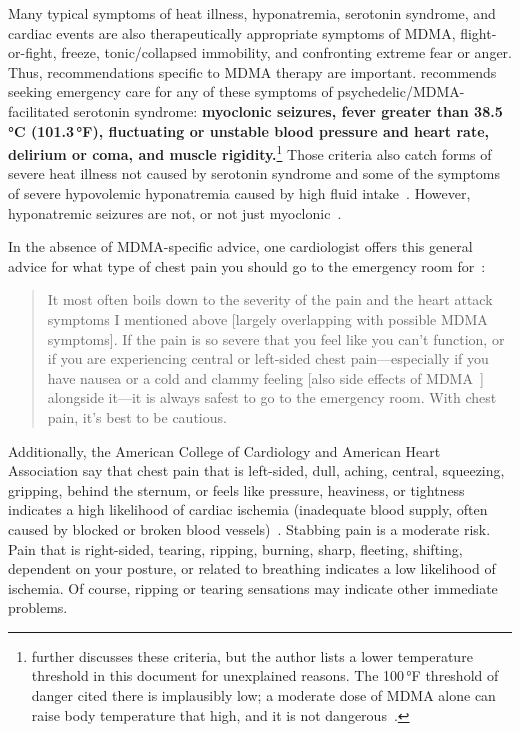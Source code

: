 \documentclass[11pt,oneside]{book}
\let\cite\parencite
\begin{document}
Many typical symptoms of heat illness, hyponatremia, serotonin syndrome, and cardiac events are also therapeutically appropriate symptoms of MDMA, flight-or-fight, freeze, tonic/collapsed immobility, and confronting extreme fear or anger. Thus, recommendations specific to MDMA therapy are important. \textcite{malcolmAyahuasca} recommends seeking emergency care for any of these symptoms of psychedelic/MDMA-facilitated serotonin syndrome: \textbf{myoclonic seizures, fever greater than 38.5\,°C (101.3\,°F), fluctuating or unstable blood pressure and heart rate, delirium or coma, and muscle rigidity.}\footnote{\textcite{malcolmER} further discusses these criteria, but the author lists a lower temperature threshold in this document for unexplained reasons. The 100\,°F threshold of danger cited there is implausibly low; a moderate dose of MDMA alone can raise body temperature that high, and it is not dangerous~\cite{liechtiTemperature}.} Those criteria also catch forms of severe heat illness not caused by serotonin syndrome and some of the symptoms of severe hypovolemic hyponatremia caused by high fluid intake~\cite{merckHyponatremia}. However, hyponatremic seizures are not, or not just myoclonic~\cite{nardoneAcuteSymptomaticSeizures2016}.

In the absence of MDMA-specific advice, one cardiologist offers this general advice for what type of chest pain you should go to the emergency room for~\cite{chestPain}:
\begin{quotation}
    It most often boils down to the severity of the pain and the heart attack symptoms I mentioned above [largely overlapping with possible MDMA symptoms]. If the pain is so severe that you feel like you can't function, or if you are experiencing central or left-sided chest pain---especially if you have nausea or a cold and clammy feeling [also side effects of MDMA~\cite{liechtiGender}] alongside it---it is always safest to go to the emergency room. With chest pain, it's best to be cautious.
\end{quotation}

Additionally, the American College of Cardiology and American Heart Association say that chest pain that is left-sided, dull, aching, central, squeezing, gripping, behind the sternum, or feels like pressure, heaviness, or tightness indicates a high likelihood of cardiac ischemia (inadequate blood supply, often caused by blocked or broken blood vessels)~\cite{ahaChestPain}. Stabbing pain is a moderate risk. Pain that is right-sided, tearing, ripping, burning, sharp, fleeting, shifting, dependent on your posture, or related to breathing indicates a low likelihood of ischemia. Of course, ripping or tearing sensations may indicate other immediate problems.
\end{document}

